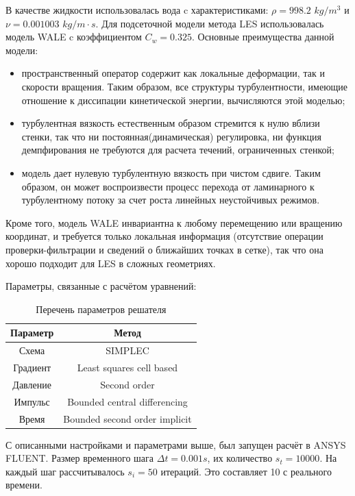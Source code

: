 	В качестве жидкости использовалась вода c характеристиками: $\rho = 998.2$ $kg/m^3$ и $\nu = 0.001003$ $kg/m\cdot s$. Для подсеточной модели метода LES использовалась модель WALE c коэффициентом $C_w = 0.325$. Основные преимущества данной модели:
	\begin{itemize}
		\item пространственный оператор содержит как локальные деформации, так и скорости вращения. Таким образом, все структуры турбулентности, имеющие отношение к диссипации кинетической энергии, вычисляются этой моделью;
		\item турбулентная вязкость естественным образом стремится к нулю вблизи стенки, так что ни постоянная(динамическая) регулировка, ни функция демпфирования не требуются для расчета течений, ограниченных стенкой;
		\item модель дает нулевую турбулентную вязкость при чистом сдвиге. Таким образом, он может воспроизвести процесс перехода от ламинарного к турбулентному потоку за счет роста линейных неустойчивых режимов. 
	\end{itemize}
	Кроме того, модель WALE инвариантна к любому перемещению или вращению координат, и требуется только локальная информация (отсутствие операции проверки-фильтрации и сведений о ближайших точках в сетке), так что она хорошо подходит для LES в сложных геометриях\cite{Nicoud1999}.
	
	Параметры, связанные с расчётом уравнений:
	\begin{table}[H]
		\begin{center}
			\begin{tabular}{|c|c|}
				\hline
				Параметр & Метод\\
				\hline
				Схема & SIMPLEC \\
				\hline
				Градиент & Least squares cell based\\
				\hline
				Давление & Second order\\
				\hline
				Импульс & Bounded central differencing\\
				\hline
				Время & Bounded second order implicit\\
				\hline
			\end{tabular}
		\end{center}
		\caption{Перечень параметров решателя}
	\end{table}
	
	С описанными настройками и параметрами выше, был запущен расчёт в ANSYS FLUENT. Размер временного шага $\Delta t = 0.001 s$, их количество $s_t = 10000$. На каждый шаг рассчитывалось $s_i = 50$ итераций. Это составляет 10 с реального времени.